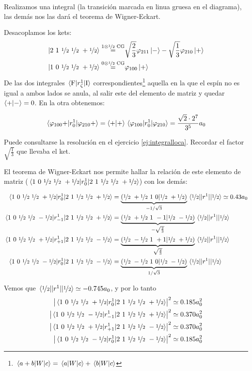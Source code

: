  Realizamos una integral (la transición marcada en linua gruesa
en el diagrama), las demás nos las dará el teorema de Wigner-Eckart.

Desacoplamos los kets:
\begin{align}
  \ket{2 \ 1 \ {\nicefrac{1}{2}} \ {\nicefrac{1}{2}} \ +{\nicefrac{1}{2}}} \stackrel{1\otimes{\nicefrac{1}{2}} \text{ CG}}{=} &
  \sqrt{\frac{2}{3}} \varphi_{211} \ket{-} -
  \sqrt{\frac{1}{3}}\varphi_{210}\ket{+} \\
  \ket{1 \ 0 \ {\nicefrac{1}{2}} \ {\nicefrac{1}{2}} \ +{\nicefrac{1}{2}}} \stackrel{0\otimes{\nicefrac{1}{2}} \text{ CG}}{=} &
   \varphi_{100} \ket{+} 
\end{align}
De las dos integrales $\mel{\text{F}}{r^1_\zeta}{\text{I}}$
correspondientes\footnote{$\mel{a+b}{W}{c}=\mel{a}{W}{c}+\mel{b}{W}{c}$}
aquella en la que el espín no es igual a ambos lados se anula, al
salir este del elemento de matriz y quedar $\braket{+}{-}=0$. En la
otra obtenemos:

\begin{equation}
    \mel{\varphi_{100}+}{r_0^1}{\varphi_{210}+} = \braket{+}{+}
    \mel{\varphi_{100}}{r_0^1}{\varphi_{210}} = \frac{\sqrt{2}\cdot2^7}{3^5}a_0
\end{equation}

Puede consultarse la resolución en el
ejercicio \ref{ej:integralloca}. Recordar el factor
$\sqrt{\frac{1}{3}}$ que llevaba el ket.

El teorema de Wigner-Eckart nos permite hallar la relación de este
elemento de matriz (${\mel{1\ 0\ \oh\ \oh\ +\oh}{r_0^1}{2\ 1\ \oh\ \oh\ +\oh}}$) con los demás:
\begin{fullwidth}
  \begin{align}
    \mel{1\ 0\ \oh\ \oh\ +\oh}{r_0^1}{2\ 1\ \oh\ \oh\ +\oh} 
    &=\underbrace{(\oh\ +\oh\ 1 \ 0 | \oh \ +\oh)}_{-1/\sqrt{3}} \mel{\oh}{|r^1|}{\oh} \simeq
      0.43 a_0 \\
    \mel{1\ 0\ \oh\ \oh\ -\oh}{r_{-1}^1}{2\ 1\ \oh\ \oh\ +\oh} 
    &=\underbrace{(\oh\ +\oh\ 1 \ -1 | \oh \ -\oh)}_{-\sqrt{\frac{2}{3}}} \mel{\oh}{|r^1|}{\oh}\\
    \mel{1\ 0\ \oh\ \oh\ +\oh}{r_{+1}^1}{2\ 1\ \oh\ \oh\ -\oh} 
    &=\underbrace{(\oh\ -\oh\ 1 \ +1 | \oh \ +\oh)}_{\sqrt{\frac{2}{3}}} \mel{\oh}{|r^1|}{\oh}\\
    \mel{1\ 0\ \oh\ \oh\ -\oh}{r_{0}^1}{2\ 1\ \oh\ \oh\ -\oh} 
    &=\underbrace{(\oh\ -\oh\ 1 \ 0 | \oh \ -\oh)}_{1/\sqrt{3}} \mel{\oh}{|r^1|}{\oh}
  \end{align}
\end{fullwidth}
Vemos que $\mel{ {\nicefrac{1}{2}} }{|r^1|}{ {\nicefrac{1}{2}} } \simeq -0.745a_0$, y por lo tanto
  \begin{align}
    \abs{\mel{1\ 0\  {\nicefrac{1}{2}} \  {\nicefrac{1}{2}} \ + {\nicefrac{1}{2}} }{r_0^1}{2\ 1\  {\nicefrac{1}{2}} \  {\nicefrac{1}{2}} \ + {\nicefrac{1}{2}} }}^2
    &\simeq 0.185  a_0^2 \\
    \abs{\mel{1\ 0\  {\nicefrac{1}{2}} \  {\nicefrac{1}{2}} \ - {\nicefrac{1}{2}} }{r_{-1}^1}{2\ 1\  {\nicefrac{1}{2}} \  {\nicefrac{1}{2}} \ + {\nicefrac{1}{2}} }}^2
    &\simeq 0.370 a_0^2\\
    \abs{\mel{1\ 0\  {\nicefrac{1}{2}} \  {\nicefrac{1}{2}} \ + {\nicefrac{1}{2}} }{r_{+1}^1}{2\ 1\  {\nicefrac{1}{2}} \  {\nicefrac{1}{2}} \ - {\nicefrac{1}{2}} }}^2
    &\simeq 0.370 a_0^2\\
    \abs{\mel{1\ 0\  {\nicefrac{1}{2}} \  {\nicefrac{1}{2}} \ - {\nicefrac{1}{2}} }{r_{0}^1}{2\ 1\  {\nicefrac{1}{2}} \  {\nicefrac{1}{2}} \ - {\nicefrac{1}{2}} }}^2
    &\simeq 0.185 a_0^2 
  \end{align}


